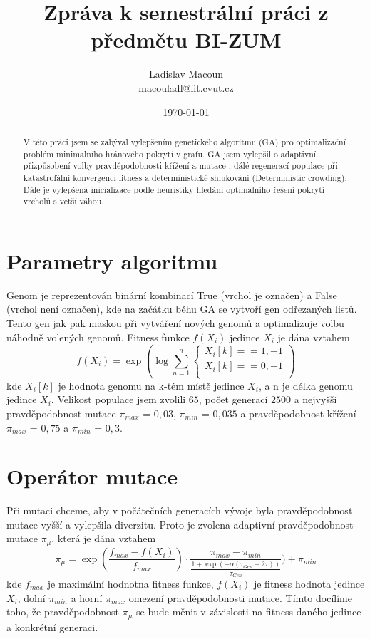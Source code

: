 \documentclass[a4paper,10pt,twocolumn]{article}
\title{Zpráva k semestrální práci z předmětu BI-ZUM}
\date{\today}
\author{Ladislav Macoun\\ macouladl@fit.cvut.cz}
\begin{document}
\maketitle
\begin{abstract}
V této práci jsem se zabýval vylepšením genetického algoritmu (GA) pro optimalizační problém minimalního hránového pokrytí v grafu. GA jsem vylepšil o adaptivní přizpůsobení volby pravděpodobnosti křížení a mutace \cite{adga}, dálé regenerací populace při katastrofální konvergenci fitness a deterministické shlukování\cite{dc}\cite{ga} (Deterministic crowding). Dále je vylepšená inicializace podle heuristiky hledání optimálního řešení pokrytí vrcholů s vetší váhou.
\end{abstract}

\section{Parametry algoritmu}
Genom je reprezentován binární kombinací True (vrchol je označen) a False (vrchol není označen),
kde na začátku běhu GA se vytvoří gen odřezaných listů. Tento gen jak pak maskou při vytváření nových genomů a optimalizuje volbu náhodně volených genomů.
Fitness funkce $f(X_i)$ jedince $X_i$ je dána vztahem 
$$f(X_i)=\exp(\log \sum_{n=1}^{n}
\begin{cases}
X_i[k] == 1, -1\\
X_i[k] == 0, +1\\
\end{cases})$$
kde $X_i[k]$ je hodnota genomu na k-tém místě jedince $X_i$, a n je délka genomu jedince $X_i$.
Velikost populace jsem zvolili $65$, počet generací $2500$ a nejvyšší pravděpodobnost mutace $\pi_{max}$ = $0,03$, $\pi_{min}$ = $0,035$ a pravděpodobnost křížení $\pi_{max}$ = $0,75$ a $\pi_{min}$ = $0,3$. 

\section{Operátor mutace}
Při mutaci chceme, aby v počátečních generacích vývoje byla pravděpodobnost mutace vyšší a vylepšila diverzitu. Proto je zvolena adaptivní pravděpodobnost mutace \cite{adga} $\pi_{\mu}$, která je dána vztahem 
$$\pi_{\mu} = \exp(\frac{f_{max} - f(X_i)}{f_{max}}) \cdot \frac{\pi_{max} - \pi_{min}}{\frac{1 + \exp(-\alpha(\tau_{Gen} - 2\tau))}{\tau_{Gen}}}) + \pi_{min} $$
kde $f_{max}$ je maximální hodnotna fitness funkce, $f(X_i)$ je fitness hodnota jedince $X_i$, dolní $\pi_{min}$ a horní $ \pi_{max}$ omezení pravděpodobnosti mutace. Tímto docílíme toho, že pravděpodobnost $\pi_{\mu}$ se bude měnit v závislosti na fitness daného jedince a konkrétní generaci.
\end{document}
